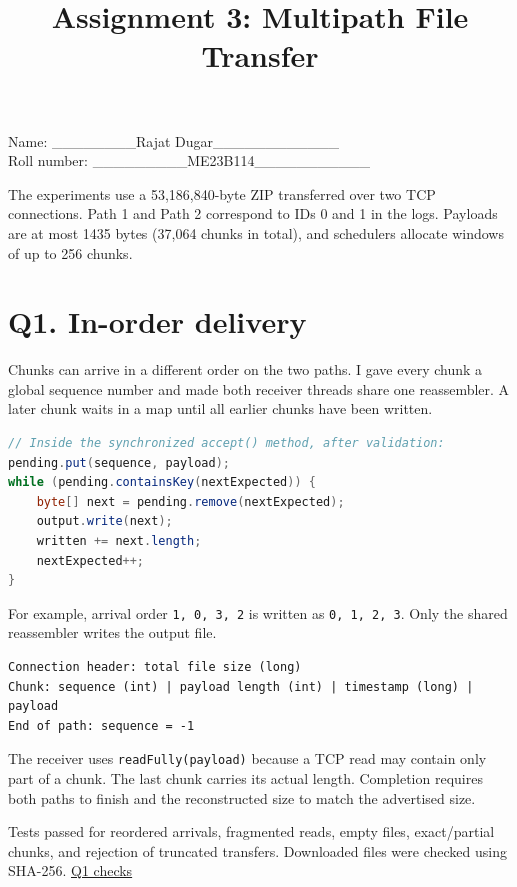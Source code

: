 \documentclass[11pt,a4paper]{article}
\title{Assignment 3: Multipath File Transfer}
\author{}
\date{}
\begin{document}
\maketitle
\vspace{-2em}


Name: \_\_\_\_\_\_\_\_Rajat Dugar\_\_\_\_\_\_\_\_\_\_\_\_\\
Roll number: \_\_\_\_\_\_\_\_\_ME23B114\_\_\_\_\_\_\_\_\_\_\_


The experiments use a 53,186,840-byte ZIP transferred over two TCP connections.
Path 1 and Path 2 correspond to IDs 0 and 1 in the logs. Payloads are at most
1435 bytes (37,064 chunks in total), and schedulers allocate windows of up to 256 chunks.


\section*{Q1. In-order delivery}

Chunks can arrive in a different order on the two paths. I gave every chunk a
global sequence number and made both receiver threads share one reassembler.
A later chunk waits in a map until all earlier chunks have been written.


\begin{lstlisting}[language=Java]
// Inside the synchronized accept() method, after validation:
pending.put(sequence, payload);
while (pending.containsKey(nextExpected)) {
    byte[] next = pending.remove(nextExpected);
    output.write(next);
    written += next.length;
    nextExpected++;
}
\end{lstlisting}

For example, arrival order \texttt{1, 0, 3, 2} is written as \texttt{0, 1, 2, 3}. Only the shared
reassembler writes the output file.


\begin{lstlisting}
Connection header: total file size (long)
Chunk: sequence (int) | payload length (int) | timestamp (long) | payload
End of path: sequence = -1
\end{lstlisting}

The receiver uses \texttt{readFully(payload)} because a TCP read may contain only part of
a chunk. The last chunk carries its actual length. Completion requires both paths
to finish and the reconstructed size to match the advertised size.


Tests passed for reordered arrivals, fragmented reads, empty files, exact/partial
chunks, and rejection of truncated transfers. Downloaded files were checked using
SHA-256. \href{../results/q1/validation.txt}{Q1 checks}
\end{document}
